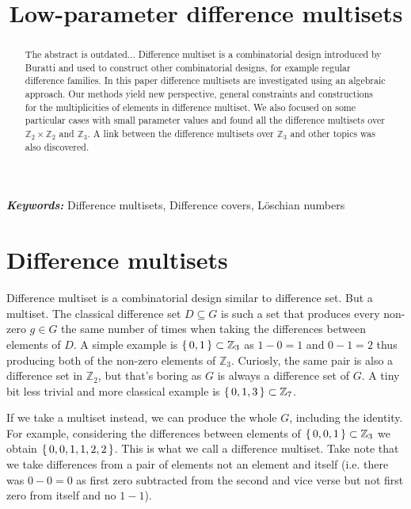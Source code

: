 \documentclass{article}
\title{Low-parameter difference multisets}
\date{}
\author{}
\theoremstyle{plain}
\theoremstyle{definition}
\theoremstyle{remark}
\providecommand{\keywords}[1]{\textbf{\textit{Keywords: }} #1}
\begin{document}
	\maketitle
	
	\begin{abstract}
	The abstract is outdated...
		Difference multiset is a combinatorial design introduced by Buratti \cite{buratti1999old} and used to construct other combinatorial designs, for example regular difference families. In this paper difference multisets are investigated using an algebraic approach. Our methods yield new perspective, general constraints and constructions for the multiplicities of elements in difference multiset. We also focused on some particular cases with small parameter values and found all the difference multisets over $\mathbb Z_2 \times \mathbb Z_2$ and $\mathbb Z_3$. A link between the difference multisets over $\mathbb Z_3$ and other topics was also discovered.
	\end{abstract}
	
	\keywords{Difference multisets, Difference covers, Löschian numbers}
    
    \section{Difference multisets}
        
        Difference multiset is a combinatorial design similar to difference set. But a multiset. The classical difference set $D \subseteq G$ is such a set that produces every non-zero $g \in G$ the same number of times when taking the differences between elements of $D$. A simple example is $\set{0,1} \subset \mathbb Z_3$ as $1-0=1$ and $0-1=2$ thus producing both of the non-zero elements of $\mathbb Z_3$. Curiosly, the same pair is also a difference set in $\mathbb Z_2$, but that's boring as $G$ is always a difference set of $G$. A tiny bit less trivial and more classical example is $\set{0,1,3} \subset \mathbb Z_7$.
        
        If we take a multiset instead, we can produce the whole $G$, including the identity. For example, considering the differences between elements of $\set{0,0,1} \subset \mathbb Z_3$ we obtain $\set{0,0,1,1,2,2}$. This is what we call a difference multiset. Take note that we take differences from a pair of elements not an element and itself (i.e. there was $0-0=0$ as first zero subtracted from the second and vice verse but not first zero from itself and no $1-1$).
        
\end{document}
